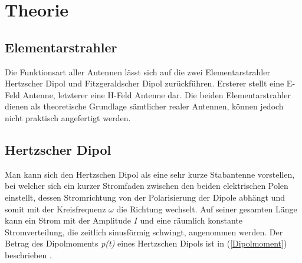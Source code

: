 \newpage
\chapter{Theorie}
\section{Elementarstrahler}\label{sec:ElementareStrahler}
Die Funktionsart aller Antennen lässt sich auf die zwei Elementarstrahler Hertzscher Dipol und Fitzgeraldscher Dipol zurückführen. Ersterer stellt eine E-Feld Antenne, letzterer eine H-Feld Antenne dar. Die beiden Elementarstrahler dienen als theoretische Grundlage sämtlicher realer Antennen, können jedoch nicht praktisch angefertigt werden.

\section{Hertzscher Dipol}
Man kann sich den Hertzschen Dipol als eine sehr kurze Stabantenne vorstellen, bei welcher sich ein kurzer Stromfaden zwischen den beiden elektrischen Polen einstellt, dessen Stromrichtung von der Polarisierung der Dipole abhängt und somit mit der Kreisfrequenz $\omega $ die Richtung wechselt. Auf seiner gesamten Länge kann ein Strom mit der Amplitude $I$ und eine räumlich konstante Stromverteilung, die zeitlich sinusförmig schwingt, angenommen werden. Der Betrag des Dipolmoments \textit{p(t)} eines Hertzschen Dipols ist in (\ref{Dipolmoment}) beschrieben \cite{Emant}. 

